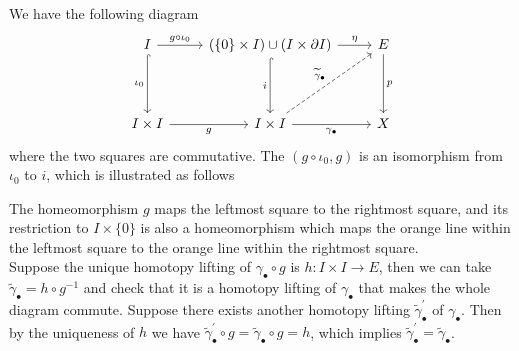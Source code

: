 \documentclass{report}
\begin{document}
\begin{prf}
	We have the following diagram
	\[
		\begin{tikzcd}[ampersand replacement=\&]
			I \arrow[d, "\iota_0"', hook]\arrow[r, "g\circ\iota_0"]\&(\{0\}\times I )\cup (I\times\partial I ) \arrow[r, "\eta"] \arrow[d, "i"', hook]                      \& E \arrow[d, "p"] \\ [+22pt]
			I \times I\arrow[r, "g"']\&I \times I \arrow[r, "\gamma_\bullet"'] \arrow[ru, "\widetilde{\gamma}_\bullet", dashed] \& X
		\end{tikzcd}
	\]
	where the two squares are commutative. The $(g\circ\iota_0, g)$ is an isomorphism from $\iota_0$ to $i$, which is illustrated as follows
	\begin{center}
	\end{center}
	The homeomorphism $g$ maps the leftmost square to the rightmost square, and its restriction to $I\times\{0\}$ is also a homeomorphism which maps the orange line within the leftmost square to the orange line within the rightmost square.\\
	Suppose the unique homotopy lifting of $\gamma_{\bullet}\circ g$ is $h:I\times I \to E$, then we can take $\widetilde{\gamma}_\bullet=h\circ g^{-1}$ and check that it is a homotopy lifting of $\gamma_\bullet$ that makes the whole diagram commute. Suppose there exists another homotopy lifting $\widetilde{\gamma}_\bullet^\prime$ of $\gamma_\bullet$. Then by the uniqueness of $h$ we have $\widetilde{\gamma}_\bullet^\prime\circ g=\widetilde{\gamma}_\bullet\circ g=h$, which implies $\widetilde{\gamma}_\bullet^\prime=\widetilde{\gamma}_\bullet$.
\end{prf}
\end{document}
